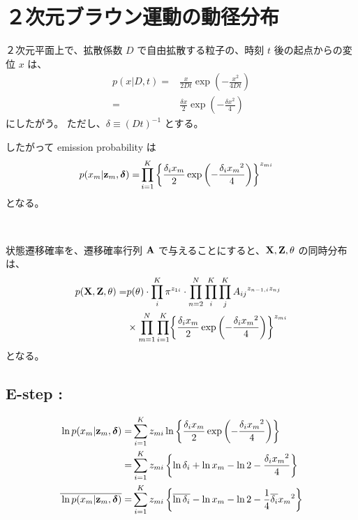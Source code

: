 
\section{ ２次元ブラウン運動の動径分布 }

２次元平面上で、拡散係数 $D$ で自由拡散する粒子の、時刻 $t$ 後の起点からの変位 $x$ は、
\begin{align}
  p(x|D, t)  =&  \frac{x}{2 D t} \exp\left( - \frac{x^2}{4 D t} \right)  \\
%
  =&  \frac{\delta x}{2} \exp\left( - \frac{\delta x^2}{4}  \right)  
\end{align}
にしたがう。
ただし、$\delta \equiv (D t)^{-1}$ とする。

したがって emission probability は
\begin{align}
  p(x_m|{\bf z}_m, {\boldsymbol \delta})  =&  \prod_{i=1}^K  \left\{ \frac{\delta_i x_m}{2} \exp\left( - \frac{\delta_i {x_m}^2}{4}  \right) \right\}^{z_{mi}}  \label{eqn:gaussDiff_pXnZn}  
\end{align}
となる。

\

状態遷移確率を、遷移確率行列 ${\bf A}$ で与えることにすると、${\bf X}, {\bf Z}, \theta$ の同時分布は、
\begin{align}
  p( {\bf X}, {\bf Z}, \theta )  =&  p( \theta ) \cdot \prod_i^K \pi^{z_{1i}} 
    \cdot \prod_{n=2}^N \prod_i^K \prod_{j}^K {A_{ij}}^{ z_{n-1, i} z_{nj} }  \notag  \\  
    &  \times \prod_{m=1}^N \prod_{i=1}^K  \biggl\{ \frac{\delta_i x_m}{2} \exp\left( - \frac{\delta_i {x_m}^2}{4} \right) \biggr\}^{z_{mi}}  \label{eqn:gaussDiff_jointDistVbHmmPc}
\end{align}
となる。


\subsection{ E-step :}
\begin{align}
  \ln {p}( x_m | {\bf z}_m, {\boldsymbol \delta} )  =&  \sum_{i=1}^K z_{mi} \ln \left\{  \frac{\delta_i x_m}{2} \exp\left( - \frac{\delta_i {x_m}^2}{4} \right)  \right\}  \\  
%
  =&  \sum_{i=1}^K z_{mi} \left\{ \ln \delta_i + \ln x_m - \ln 2 - \frac{ \delta_i {x_m}^2 }{ 4 } \right\}  \\  
%
  \overline{\mathstrut \ln {p}( x_m | {\bf z}_m, {\boldsymbol \delta} )} =&  \sum_{i=1}^K z_{mi} \left\{ \overline{\ln \delta_i} - \ln x_m - \ln 2 - \frac{1}{4} \overline{\delta_i} {x_m}^2 \right\}
\end{align}

